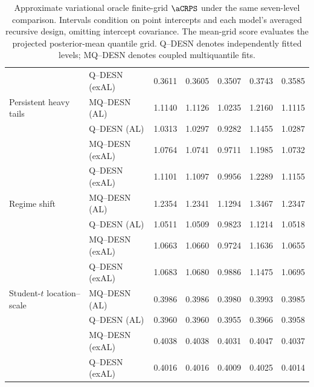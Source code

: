 \begin{table}[p]
\begin{tabular}{@{}>{\raggedright\arraybackslash}p{}>{\raggedright\arraybackslash}p{}rrrrr@{}}
 & Q--DESN (exAL) & 0.3611 & 0.3605 & 0.3507 & 0.3743 & 0.3585 \\
\addlinespace[2pt]
Persistent heavy tails & MQ--DESN (AL) & 1.1140 & 1.1126 & 1.0235 & 1.2160 & 1.1115 \\
 & Q--DESN (AL) & 1.0313 & 1.0297 & 0.9282 & 1.1455 & 1.0287 \\
 & MQ--DESN (exAL) & 1.0764 & 1.0741 & 0.9711 & 1.1985 & 1.0732 \\
 & Q--DESN (exAL) & 1.1101 & 1.1097 & 0.9956 & 1.2289 & 1.1155 \\
\addlinespace[2pt]
Regime shift & MQ--DESN (AL) & 1.2354 & 1.2341 & 1.1294 & 1.3467 & 1.2347 \\
 & Q--DESN (AL) & 1.0511 & 1.0509 & 0.9823 & 1.1214 & 1.0518 \\
 & MQ--DESN (exAL) & 1.0663 & 1.0660 & 0.9724 & 1.1636 & 1.0655 \\
 & Q--DESN (exAL) & 1.0683 & 1.0680 & 0.9886 & 1.1475 & 1.0695 \\
\addlinespace[2pt]
Student-\(t\) location--scale & MQ--DESN (AL) & 0.3986 & 0.3986 & 0.3980 & 0.3993 & 0.3985 \\
 & Q--DESN (AL) & 0.3960 & 0.3960 & 0.3955 & 0.3966 & 0.3958 \\
 & MQ--DESN (exAL) & 0.4038 & 0.4038 & 0.4031 & 0.4047 & 0.4037 \\
 & Q--DESN (exAL) & 0.4016 & 0.4016 & 0.4009 & 0.4025 & 0.4014 \\
\bottomrule
\end{tabular}
\caption{Approximate variational oracle finite-grid \(\aCRPS\) under the same seven-level comparison. Intervals condition on point intercepts and each model's averaged recursive design, omitting intercept covariance. The mean-grid score evaluates the projected posterior-mean quantile grid. Q--DESN denotes independently fitted levels; MQ--DESN denotes coupled multiquantile fits.}
\label{tab:joint-qdesn-pure-desn-v2-vb-score}
\end{table}
